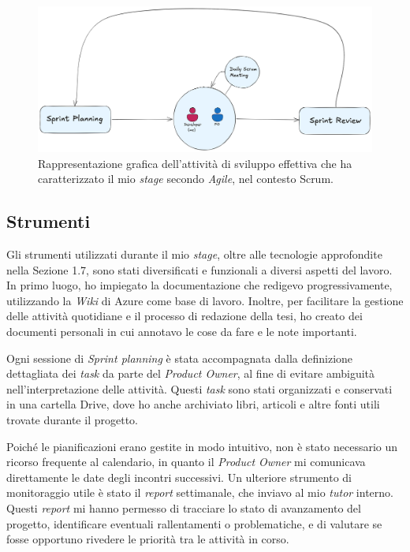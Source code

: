         \begin{figure}[H]
            \centering
            \includegraphics[width=0.7\linewidth]{BCS-Tessi/images/Sprint_true.png}
            \caption[Rappresentazione dell'attività di sviluppo effettiva secondo \textit{Agile} (Scrum)]{Rappresentazione grafica dell'attività di sviluppo effettiva che ha caratterizzato il mio \textit{stage} secondo \textit{Agile}, nel contesto Scrum.}
            \label{fig:Sprint-effettivi}
        \end{figure}
        
        \subsection{Strumenti}
        Gli strumenti utilizzati durante il mio \textit{stage}, oltre alle tecnologie approfondite nella Sezione 1.7, sono stati diversificati e funzionali a diversi aspetti del lavoro. In primo luogo, ho impiegato la documentazione che redigevo progressivamente, utilizzando la \textit{Wiki} di Azure come base di lavoro. Inoltre, per facilitare la gestione delle attività quotidiane e il processo di redazione della tesi, ho creato dei documenti personali in cui annotavo le cose da fare e le note importanti. 

        \vspace{0.2 em}
        \noindent Ogni sessione di \textit{Sprint planning} è stata accompagnata dalla definizione dettagliata dei \textit{task} da parte del \textit{Product Owner}, al fine di evitare ambiguità nell’interpretazione delle attività. Questi \textit{task} sono stati organizzati e conservati in una cartella Drive, dove ho anche archiviato libri, articoli e altre fonti utili trovate durante il progetto. 

        \vspace{0.2 em}
        \noindent Poiché le pianificazioni erano gestite in modo intuitivo, non è stato necessario un ricorso frequente al calendario, in quanto il \textit{Product Owner} mi comunicava direttamente le date degli incontri successivi. Un ulteriore strumento di monitoraggio utile è stato il \textit{report} settimanale, che inviavo al mio \textit{tutor} interno. Questi \textit{report} mi hanno permesso di tracciare lo stato di avanzamento del progetto, identificare eventuali rallentamenti o problematiche, e di valutare se fosse opportuno rivedere le priorità tra le attività in corso.
        

